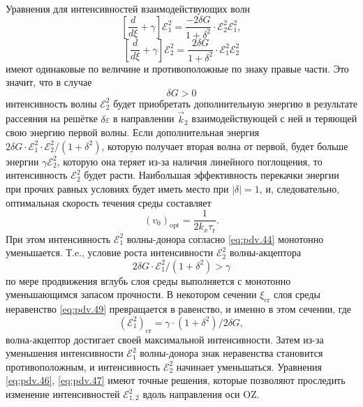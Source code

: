 Уравнения для интенсивностей взаимодействующих волн
\begin{equation}
	\label{eq:pdv.46}
	{\left[\frac{d}{d \xi}+\gamma \right] \mathcal{E}_{1}^{2}=\frac{-2 \delta G}{1+\delta^{2}} \cdot \mathcal{E}_{2}^{2} \mathcal{E}_{1}^{2}},
\end{equation}
\begin{equation}
	\label{eq:pdv.47}
	\left[\frac{d}{d \xi}+\gamma \right] \mathcal{E}_{2}^{2}=\frac{2 \delta G}{1+\delta^{2}} \cdot \mathcal{E}_{1}^{2} \mathcal{E}_{2}^{2}
\end{equation}
имеют одинаковые по величине и противоположные по знаку правые части. Это значит, что в случае
\begin{equation*}
	\delta G > 0
\end{equation*}
интенсивность волны ${\mathcal{E}}_{2}^2$ будет приобретать дополнительную энергию в результате рассеяния на решётке $\delta \varepsilon$ в направлении $\vec{k}_2$ взаимодействующей с ней и теряющей свою энергию первой волны. Если дополнительная энергия $2\delta G \cdot \mathcal{E}_1^2 \cdot \mathcal{E}_2^2 / (1+\delta^2)$, которую получает вторая волна от первой, будет больше энергии $\gamma \mathcal{E}_2^2$, которую она теряет из-за наличия линейного поглощения, то интенсивность $\mathcal{E}_2^2$ будет расти. Наибольшая эффективность перекачки энергии при прочих равных условиях будет иметь место при $|\delta| = 1$, и, следовательно, оптимальная скорость течения среды составляет
\begin{equation}
	\label{eq:pdv.48}
	(v_0)_\text{opt} = \frac{1}{2 k_x \tau_\text{r}}.
\end{equation}
При этом интенсивность $\mathcal{E}_1^2$ волны-донора согласно \eqref{eq:pdv.44} монотонно уменьшается. Т.e., условие роста интенсивности $\mathcal{E}_2^2$ волны-акцептора
\begin{equation}
	\label{eq:pdv.49}
	2 \delta G \cdot \mathcal{E}_{1}^{2} /\left(1+\delta^{2}\right)>\gamma
\end{equation}
по мере продвижения вглубь слоя среды выполняется с монотонно уменьшающимся запасом прочности. В некотором сечении $\xi_\text{cr}$ слоя среды неравенство \eqref{eq:pdv.49} превращается в равенство, и именно в этом сечении, где
\begin{equation}
	\label{eq:pdv.50}
	\left({\mathcal { E }}_{1}^{2}\right)_\text{cr}=\gamma \cdot\left(1+\delta^{2}\right) / 2 \delta G,
\end{equation}
волна-акцептор достигает своей максимальной интенсивности. Затем из-за уменьшения интенсивности $\mathcal{E}_1^2$ волны-донора знак неравенства становится противоположным, и интенсивность $\mathcal{E}_2^2$ начинает уменьшаться. Уравнения \eqref{eq:pdv.46}, \eqref{eq:pdv.47} имеют точные решения, которые позволяют проследить изменение интенсивностей $\mathcal{E}_{1,2}^2$ вдоль направления оси OZ.

